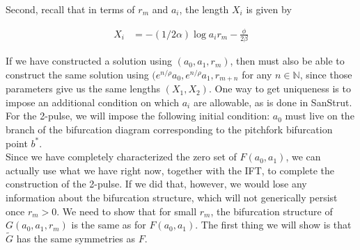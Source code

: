 \documentclass[12pt]{article}
\def\N{{\mathbb N}}
\begin{document}
Second, recall that in terms of $r_m$ and $a_i$, the length $X_i$ is given by 

\begin{align*}
X_i &= -(1/ 2 \alpha)\log a_i r_m - \frac{\phi}{2 \beta} 
\end{align*}

If we have constructed a solution using $(a_0, a_1, r_m)$, then must also be able to construct the same solution using $(e^{n/\rho} a_0, e^{n/\rho} a_1, r_{m+n}$ for any $n \in \N$, since those parameters give us the same lengths $(X_1, X_2)$. One way to get uniqueness is to impose an additional condition on which $a_i$ are allowable, as is done in SanStrut. For the 2-pulse, we will impose the following initial condition: $a_0$ must live on the branch of the bifurcation diagram corresponding to the pitchfork bifurcation point $b^*$. \\

Since we have completely characterized the zero set of $F(a_0, a_1)$, we can actually use what we have right now, together with the IFT, to complete the construction of the 2-pulse. If we did that, however, we would lose any information about the bifurcation structure, which will not generically persist once $r_m > 0$. We need to show that for small $r_m$, the bifurcation structure of $G(a_0, a_1, r_m)$ is the same as for $F(a_0, a_1)$. The first thing we will show is that $\tilde{G}$ has the same symmetries as $F$.

\end{document}
